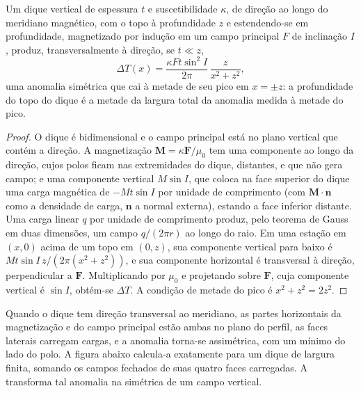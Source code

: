 \begin{proposition}\label{prop:b3:field-lab-methods-3:dyke}
Um dique vertical de espessura $t$ e suscetibilidade $\kappa$, de direção
ao longo do meridiano magnético, com o topo à profundidade $z$ e estendendo-se
em profundidade, magnetizado por indução em um campo principal $F$ de inclinação $I$,
produz, transversalmente à direção, se $t \ll z$,
\[
\Delta T(x) = \frac{\kappa F t\sin^2 I}{2\pi}\,\frac{z}{x^2 + z^2} ,
\]
uma anomalia simétrica que cai à metade de seu pico em $x = \pm z$: a
profundidade do topo do dique é a metade da largura total da anomalia
medida à metade do pico.
\end{proposition}

\begin{proof}
O dique é bidimensional e o campo principal está no plano vertical
que contém a direção. A magnetização $\mathbf{M} = \kappa\mathbf{F}/\mu_0$
tem uma componente ao longo da direção, cujos polos ficam nas extremidades do
dique, distantes, e que não gera campo; e uma componente vertical $M
\sin I$, que coloca na face superior do dique uma carga magnética de
$-Mt\sin I$ por unidade de comprimento (com $\mathbf{M}\cdot\mathbf{n}$ como a
densidade de carga, $\mathbf{n}$ a normal externa), estando a face inferior
distante. Uma carga linear $q$ por unidade de comprimento produz, pelo
teorema de Gauss em duas dimensões, um campo $q/(2\pi r)$ ao longo do raio. Em uma
estação em $(x, 0)$ acima de um topo em $(0, z)$, sua componente vertical para baixo é
$Mt\sin I\,z/(2\pi(x^2 + z^2))$, e sua componente horizontal é
transversal à direção, perpendicular a $\mathbf{F}$. Multiplicando por
$\mu_0$ e projetando sobre $\mathbf{F}$, cuja componente vertical é
$\sin I$, obtém-se $\Delta T$. A condição de metade do pico é $x^2 + z^2 =
2z^2$.
\end{proof}

Quando o dique tem direção transversal ao meridiano, as partes horizontais da
magnetização e do campo principal estão ambas no plano do
perfil, as faces laterais carregam cargas, e a anomalia torna-se
assimétrica, com um mínimo do lado do polo. A figura abaixo
calcula-a exatamente para um dique de largura finita, somando os campos fechados
de suas quatro faces carregadas. A  transforma tal
anomalia na simétrica de um campo vertical.

